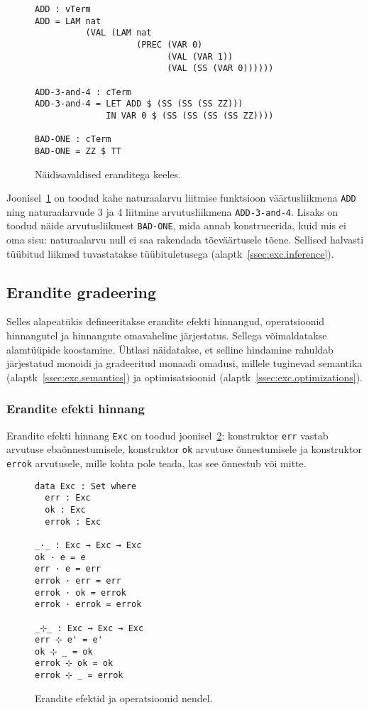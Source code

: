 \documentclass[a4paper,12pt]{article}
\begin{document}
\begin{figure}
  \begin{verbatim}
ADD : vTerm
ADD = LAM nat
          (VAL (LAM nat
                    (PREC (VAR 0)
                          (VAL (VAR 1))
                          (VAL (SS (VAR 0))))))

ADD-3-and-4 : cTerm
ADD-3-and-4 = LET ADD $ (SS (SS (SS ZZ)))
              IN VAR 0 $ (SS (SS (SS (SS ZZ))))

BAD-ONE : cTerm
BAD-ONE = ZZ $ TT\end{verbatim}
  \caption{Näidisavaldised eranditega keeles.}
  \label{fig:exc.raw.ex1}
\end{figure}

Joonisel~\ref{fig:exc.raw.ex1} on toodud kahe naturaalarvu liitmise funktsioon väärtusliikmena {\tt ADD}
ning naturaalarvude 3 ja 4 liitmine arvutusliikmena {\tt ADD-3-and-4}.
Lisaks on toodud näide arvutusliikmest {\tt BAD-ONE}, mida annab konstrueerida,
kuid mis ei oma sisu: naturaalarvu null ei saa rakendada tõeväärtusele tõene.
Sellised halvasti tüübitud liikmed tuvastatakse tüübituletusega (alaptk~\ref{ssec:exc.inference}).

\subsection{Erandite gradeering}\label{ssec:exc.grading}

Selles alapeatükis defineeritakse erandite efekti hinnangud, operatsioonid hinnangutel ja hinnangute omavaheline järjestatus.
Sellega võimaldatakse alamtüüpide koostamine.
Ühtlasi näidatakse, et selline hindamine rahuldab järjestatud monoidi ja gradeeritud monaadi omadusi,
millele tuginevad semantika (alaptk~\ref{ssec:exc.semantics}) ja optimisatsioonid (alaptk~\ref{ssec:exc.optimizations}). 

\subsubsection{Erandite efekti hinnang}\label{sssec:exc.exc}

Erandite efekti hinnang {\tt Exc} on toodud joonisel~\ref{fig:exc.exc}:
konstruktor {\tt err} vastab arvutuse ebaõnnestumisele,
konstruktor {\tt ok} arvutuse õnnestumisele ja konstruktor {\tt errok} arvutusele,
mille kohta pole teada, kas see õnnestub või mitte.

\begin{figure}
  \begin{verbatim}
data Exc : Set where
  err : Exc
  ok : Exc
  errok : Exc

_·_ : Exc → Exc → Exc
ok · e = e
err · e = err
errok · err = err
errok · ok = errok
errok · errok = errok

_⊹_ : Exc → Exc → Exc
err ⊹ e' = e'
ok ⊹ _ = ok
errok ⊹ ok = ok
errok ⊹ _ = errok\end{verbatim}
  \caption{Erandite efektid ja operatsioonid nendel.}
  \label{fig:exc.exc}
\end{figure}
\end{document}
